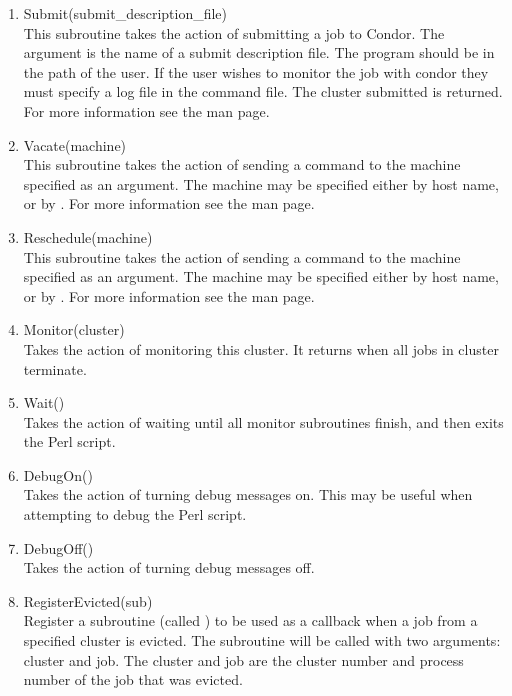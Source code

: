 \begin{enumerate}
	\item Submit(submit\_description\_file) \\
	This subroutine takes the action of submitting a job to Condor.
	The argument is the name of a submit description file.
	The  program should be in the
	path of the user.  If the user wishes to monitor the job with condor
	they must specify a log file in the command file.  The cluster
	submitted is returned. For more information
	see the  man page.
	
	\item Vacate(machine) \\
	This subroutine takes the action of sending a
	 command to the machine specified as an argument.
	The machine may be specified
	either by host name, or by .  For more information
	see the  man page.

	\item Reschedule(machine) \\
	This subroutine takes the action of sending a
	 command to the machine specified as an argument.
	The machine may be specified either
 	by host name, or by .  For more information see
	the  man page.

	\item Monitor(cluster) \\
	Takes the action of monitoring this cluster.
	It returns when all jobs in cluster terminate.
	
	\item Wait() \\
	Takes the action of waiting until all monitor subroutines finish,
	and then exits the Perl script.

	\item DebugOn() \\
	Takes the action of turning debug messages on.
	This may be useful when attempting to debug the Perl script.

	\item DebugOff() \\
	Takes the action of turning debug messages off.

	\item RegisterEvicted(sub) \\
	Register a subroutine (called )
	to be used as a callback when a job from
	a specified cluster is evicted.  The subroutine will be
	called with two arguments: cluster and job. The cluster
	and job are the cluster number and process number of the job that
	was evicted.
	

\end{enumerate}
